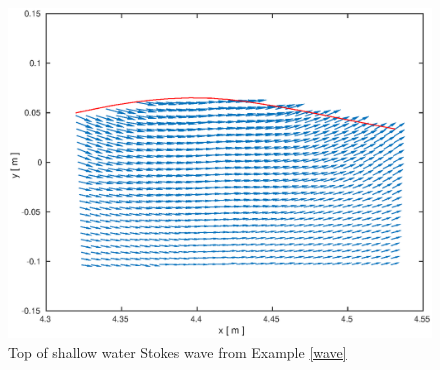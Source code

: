 \documentclass[10pt]{article}
\renewcommand{\lstlistingname}{Example}
\begin{document}
\begin{figure}[htp]  
  \centering
  \includegraphics[width=.6\textwidth]{wave_velocityfield.eps}
  \caption{Top of shallow water Stokes wave from {\lstlistingname} \ref{wave}}
  \label{fig:waveworld}
\end{figure}
  
\end{document}
